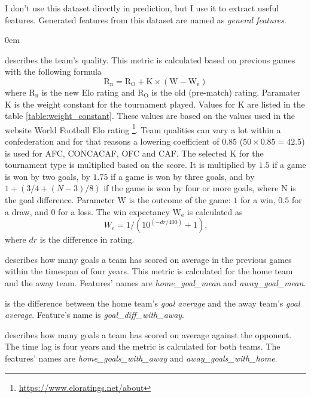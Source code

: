 I don't use this dataset directly in prediction, but I use it to extract useful features. Generated features from this dataset are named as \textit{general features}.
\renewcommand{\labelitemi}{}
\begin{description}
    \itemsep0em
    \item[Elo rating] describes the team's quality. This metric is calculated based on previous games with the following formula \begin{equation}
        \mathrm { R } _ { \mathrm { n } } = \mathrm { R } _ { \mathrm { O } } + \mathrm { K } \times \left( \mathrm { W } - \mathrm { W } _ { \mathrm { e } } \right)
    \end{equation}
    where $\mathrm { R } _ { \mathrm { n } }$ is the new Elo rating and $\mathrm { R }  _ { \mathrm { O } }$ is the old (pre-match) rating. Paramater $\mathrm { K }$ is the weight constant for the tournament played. Values for $\mathrm { K }$ are listed in the table \ref{table:weight_constant}. These values are based on the values used in the website World Football Elo rating \footnote{\url{https://www.eloratings.net/about}}. Team qualities can vary a lot within a confederation and for that reasons a lowering coefficient of $0.85$ ($50 \times 0.85 = 42.5$) is used for AFC, CONCACAF, OFC and CAF. The selected $\mathrm { K }$ for the tournament type is multiplied based on the score. It is multiplied by $1.5$ if a game is won by two goals, by $1.75$ if a game is won by three goals, and by $1 + (3/4 + (N-3)/8)$ if the game is won by four or more goals, where N is the goal difference. Parameter $\mathrm { W }$ is the outcome of the game: $1$ for a win, $0.5$ for a draw, and $0$ for a loss. The win expectancy $\mathrm { W } _ { \mathrm { e } }$ is calculated as
    \begin{equation}
        W _ { e } = 1 / \left( 10 ^ { ( - d r / 400 ) } + 1 \right)\text{,}
    \end{equation}
    where $dr$ is the difference in rating.

    \item[Goal average] describes how many goals a team has scored on average in the previous games within the timespan of four years. This metric is calculated for the home team and the away team. Features' names are \textit{home\_goal\_mean} and \textit{away\_goal\_mean}.
    \item[Goal average difference] is the difference between the home team's \textit{goal average} and the away team's \textit{goal average}. Feature's name is \textit{goal\_diff\_with\_away}.
    \item[Goal average with the opponent] describes how many goals a team has scored on average against the opponent. The time lag is four years and the metric is calculated for both teams. The features' names are \textit{home\_goals\_with\_away} and \textit{away\_goals\_with\_home}.
\end{description}

